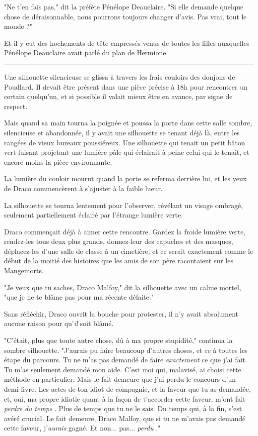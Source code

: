 "Ne t'en fais pas," dit la préfète Pénélope Deauclaire. "Si elle demande quelque chose de déraisonnable, nous pourrons toujours changer d'avis. Pas vrai, tout le monde ?"

Et il y eut des hochements de tête empressés venus de toutes les filles auxquelles Pénélope Deauclaire avait parlé du plan de Hermione.
\par\noindent\rule{\textwidth}{0.4pt}
Une silhouette silencieuse se glissa à travers les frais couloirs des donjons de Poudlard. Il devait être présent dans une pièce précise à 18h pour rencontrer un certain quelqu'un, et si possible il valait mieux être en avance, par signe de respect.

Mais quand sa main tourna la poignée et poussa la porte dans cette salle sombre, silencieuse et abandonnée, il y avait une silhouette se tenant déjà là, entre les rangées de vieux bureaux poussiéreux. Une silhouette qui tenait un petit bâton vert luisant projetant une lumière pâle qui éclairait à peine celui qui le tenait, et encore moins la pièce environnante.

La lumière du couloir mourut quand la porte se referma derrière lui, et les yeux de Draco commencèrent à s'ajuster à la faible lueur.

La silhouette se tourna lentement pour l'observer, révélant un visage ombragé, seulement partiellement éclairé par l'étrange lumière verte.

Draco commençait déjà à aimer cette rencontre. Gardez la froide lumière verte, rendez-les tous deux plus grands, donnez-leur des capuches et des masques, déplacez-les d'une salle de classe à un cimetière, et ce serait exactement comme le début de la moitié des histoires que les amis de son père racontaient sur les Mangemorts.

"Je veux que tu saches, Draco Malfoy," dit la silhouette avec un calme mortel, "que je ne te blâme pas pour ma récente défaite."

Sans réfléchir, Draco ouvrit la bouche pour protester, il n'y avait absolument aucune raison pour qu'\emph{il}  soit blâmé.

"C'était, plus que toute autre chose, dû à ma propre stupidité," continua la sombre silhouette. "J'aurais pu faire beaucoup d'autres choses, et ce à toutes les étape du parcours. Tu ne m'as pas demandé de faire \emph{exactement}  ce que j'ai fait. Tu m'as seulement demandé mon aide. C'est moi qui, malavisé, ai choisi cette méthode en particulier. Mais le fait demeure que j'ai perdu le concours d'un demi-livre. Les actes de ton idiot de compagnie, et la faveur que tu as demandée, et, oui, ma propre idiotie quant à la façon de t'accorder cette faveur, m'ont fait \emph{perdre du temps} . Plus de temps que tu ne le sais. Du temps qui, à la fin, s'est avéré crucial. Le fait demeure, Draco Malfoy, que si tu ne m'avais pas demandé cette faveur, j'\emph{aurais}  gagné. Et non... pas... \emph{perdu} ."

